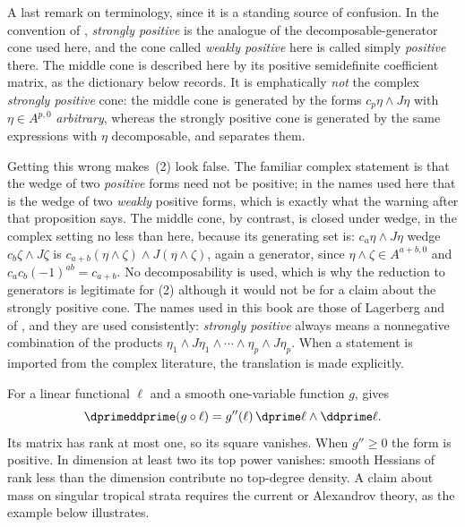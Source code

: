 A last remark on terminology, since it is a standing source of confusion.
In the convention of \cite[Chapter~III]{DemBook}, \emph{strongly positive}
is the analogue of the decomposable-generator cone used here, and the cone
called \emph{weakly positive} here is called simply \emph{positive} there.
The middle cone is described here by its positive semidefinite coefficient
matrix, as the dictionary below records.  It is emphatically \emph{not}
the complex \emph{strongly positive} cone: the middle cone is generated by
the forms $c_p\eta\wedge J\eta$ with $\eta\in A^{p,0}$ \emph{arbitrary},
whereas the strongly positive cone is generated by the same expressions with
$\eta$ decomposable, and  separates them.

Getting this wrong makes \,(2) look
false.  The familiar complex statement is that the wedge of two
\emph{positive} forms need not be positive; in the names used here that is
the wedge of two \emph{weakly} positive forms, which is exactly what the
warning after that proposition says.  The middle cone, by contrast, is
closed under wedge, in the complex setting no less than here, because its
generating set is: $c_a\eta\wedge J\eta$ wedge $c_b\zeta\wedge J\zeta$ is
$c_{a+b}(\eta\wedge\zeta)\wedge J(\eta\wedge\zeta)$, again a generator,
since $\eta\wedge\zeta\in A^{a+b,0}$ and
$c_ac_b(-1)^{ab}=c_{a+b}$.  No decomposability is used, which is why the
reduction to generators is legitimate for (2) although it would not be for
a claim about the strongly positive cone.  The names used in this book are those of Lagerberg
and of \cite{CLD25}, and they are used consistently: \emph{strongly
positive} always means a nonnegative combination of the products
$\eta_1\wedge J\eta_1\wedge\cdots\wedge\eta_p\wedge J\eta_p$.  When a
statement is imported from the complex literature, the translation is made
explicitly.

\begin{example}
\label{ex:ch09-rank-one}
For a linear functional $\ell$ and a smooth one-variable function $g$,
 gives
\[
 \dprimeddprime(g\circ\ell)=g''(\ell)\,
                 \dprime\ell\wedge\ddprime\ell.
\]
Its matrix has rank at most one, so its square vanishes.  When $g''\geq0$
the form is positive.  In dimension at least two its top power vanishes:
smooth Hessians of rank less than the dimension contribute no top-degree
density.  A claim about mass on singular tropical strata requires the
current or Alexandrov theory, as the example below illustrates.
\end{example}

